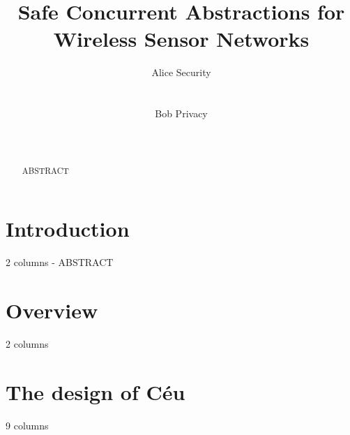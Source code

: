 \documentclass[10pt]{sensys-proc}
\author{
%
\alignauthor Alice Security \\
        \affaddr{Department of Computer Science}\\
        \affaddr{University of Southern California}\\
       \email{alice@example.edu}
\alignauthor Bob Privacy \\
    \affaddr{Networked Embedded Systems Group}\\
    \affaddr{Swedish Institute of Computer Science}\\
    \email{bob@example.se}
}
\title{Safe Concurrent Abstractions for Wireless Sensor Networks}
\begin{document}
\maketitle

\begin{abstract}
ABSTRACT
\end{abstract}




\section{Introduction}
\label{sec.intro}

2 columns - ABSTRACT

\newpage
\section{Overview}
\label{sec.overview}

2 columns

\newpage
\section{The design of C\'eu}
\label{sec.ceu}

9 columns
\end{document}
